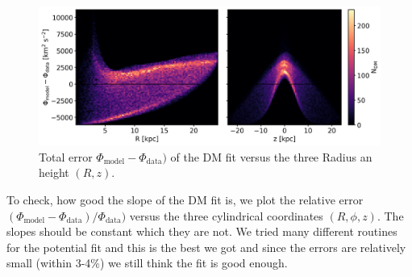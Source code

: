 \begin{figure}
\captionsetup{format=plain}
    \centering
    \includegraphics[width=\textwidth]{plots/Auriga/total_phi_error_snap_127.png}
    \caption{Total error $\Phi_\mathrm{model} - \Phi_\mathrm{data})$ of the \ac{DM} fit versus the three Radius an height $(R, z)$.}
    \label{fig:potential_fit_abs_errors}
\end{figure}
To check, how good the slope of the \ac{DM} fit is, we plot the relative error $(\Phi_\mathrm{model} - \Phi_\mathrm{data})/\Phi_\mathrm{data})$ versus the three cylindrical coordinates $(R, \phi, z)$. The slopes should be constant which they are not. We tried many different routines for the potential fit and this is the best we got and since the errors are relatively small (within 3-4\%) we still think the fit is good enough.

